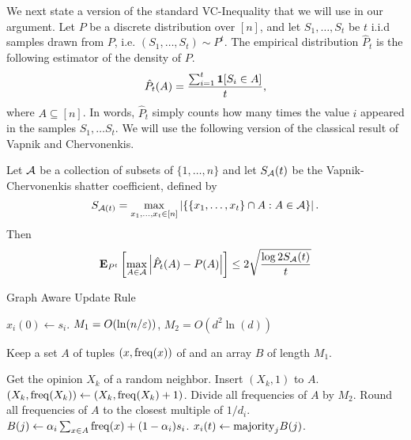 We next state a version of the standard VC-Inequality that we will use
in our argument.  Let $P$ be a discrete distribution over $[n]$, and let
$S_1, \ldots, S_t$ be $t$ i.i.d samples drawn from $P$, i.e.
$(S_1, \ldots, S_t) \sim P^t$.  The empirical distribution $\hat{P}_t$ is the
following estimator of the density of $P$.
\begin{equation}\label{eq:empirical_distribution}
  \hat{P}_t(A) = \frac{\sum_{i=1}^t \bm{1}{\left[S_i \in A\right]}}{t},
\end{equation}
where $A \subseteq [n]$. In words, $\hat{P}_t$ simply counts
how many times the value $i$ appeared in the samples $S_1, \ldots S_t$.
We will use the following version of the classical result of Vapnik and
Chervonenkis.
\begin{lemma}\label{l:vc_inequality}
  Let $\mathcal{A}$ be a collection of subsets of $\{1,\ldots, n\}$ and let
  $S_{\mathcal{A}}(t)$ be the Vapnik-Chervonenkis shatter coefficient, defined
  by
  \[
    S_{\mathcal{A}(t)} = \max_{x_1,\ldots, x_t \in [n]}
    \left| \{ \{x_1, \ldots, x_t\} \cap A : A \in \mathcal{A} \} \right|.
  \]
  Then
  \[
    \bm{\mathrm{E}}_{P^t} \left[ \max_{A \in \mathcal{A}} \left| \hat{P}_t(A) - P(A) \right| \right]
    \leq 2 \sqrt{\frac{\log{2 S_{\mathcal{A}}(t)}}{t}}
  \]
\end{lemma}

\begin{algorithm}
  \caption{Graph Aware Update Rule}
  \label{alg:frequencies}
  \begin{algorithmic}[1]
    \STATE $x_i(0) \gets s_i$.
    \STATE $M_1 = O(\ln(n/\varepsilon))$, $M_2 = O(d^2 \ln(d))$

    \STATE Keep a set $A$ of tuples $(x, \mathrm{freq}(x))$
    of and an array $B$ of length $M_1$.


    \STATE Get the opinion $X_k$ of a random neighbor.
    \STATE Insert $(X_k, 1)$ to $A$.
    \ELSE
    \STATE $(X_k, \mathrm{freq}(X_k))
    \gets (X_k,  \mathrm{freq}(X_k) +1) $.
  \ENDIF
\ENDFOR
\STATE Divide all frequencies of $A$ by $M_2$.  \label{alg:line:counters}
\STATE Round all frequencies of $A$ to the closest multiple of $1/d_i$.
\STATE $B(j) \gets \alpha_i \sum_{x \in A} \mathrm{freq}(x) + (1-\alpha_i) s_i$.
\ENDFOR
\STATE $x_i(t) \gets \mathrm{majority}_j B(j)$.
\ENDFOR
\end{algorithmic}
\end{algorithm}

